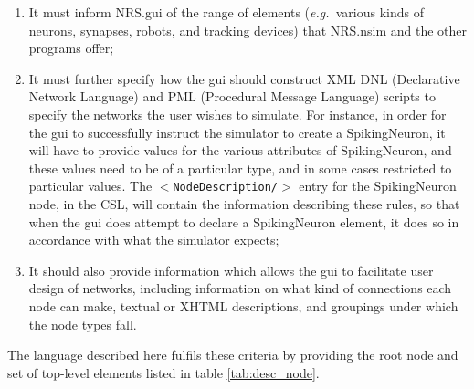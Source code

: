 \documentclass[pdftex,a4paper]{article}
\newcommand{\eg}{{\em e.g.\ }}
\newcommand{\XML}[2][]{{\tt \small $<$#2#1/$>$}}
\begin{document}
\begin{enumerate}

\item It must inform NRS.gui of the range of elements (\eg various
  kinds of neurons, synapses, robots, and tracking devices) that
  NRS.nsim and the other programs offer;

\item It must further specify how the gui should construct XML DNL
  (Declarative Network Language) and PML (Procedural Message Language)
  scripts to specify the networks the user wishes to simulate. For
  instance, in order for the gui to successfully instruct the simulator
  to create a SpikingNeuron, it will have to provide values for the
  various attributes of SpikingNeuron, and these values need to be of a
  particular type, and in some cases restricted to particular
  values. The \XML{NodeDescription} entry for the SpikingNeuron node, in
  the CSL, will contain the information describing these rules, so that
  when the gui does attempt to declare a SpikingNeuron element, it does
  so in accordance with what the simulator expects;

\item It should also provide information which allows the gui to
  facilitate user design of networks, including information on what
  kind of connections each node can make, textual or XHTML
  descriptions, and groupings under which the node types fall.

\end{enumerate}

The language described here fulfils these criteria by providing the
root node and set of top-level elements listed in table
\ref{tab:desc_node}.
\end{document}
